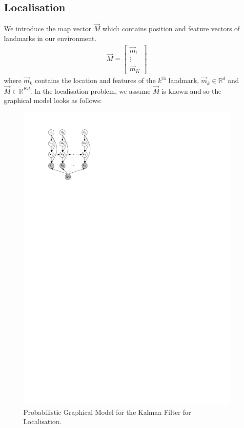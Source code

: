 \subsection{Localisation}
\label{subsec:models/kf/localisation}
We introduce the map vector $\vec M$ which contains position and feature vectors of landmarks in our environment.
\begin{align}
	\vec M = 
		\begin{bmatrix}
			\vec m_1 \\
			\vdots \\
			\vec m_K
		\end{bmatrix}
\end{align}
where $\vec m_k$ contains the location and features of the $k^{\text{th}}$ landmark, $\vec m_k \in \mathbb R^d$ and $\vec M \in \mathbb R^{Kd}$. In the localisation problem, we assume $\vec M$ is known and so the graphical model looks as follows:
\begin{figure}[!htb]
\centering
\includegraphics[scale=1]{models/kf/figures/kf-loc}
\caption{Probabilistic Graphical Model for the Kalman Filter for Localisation.}
\label{fig:models/kf/figures/kf-loc}
\end{figure}

